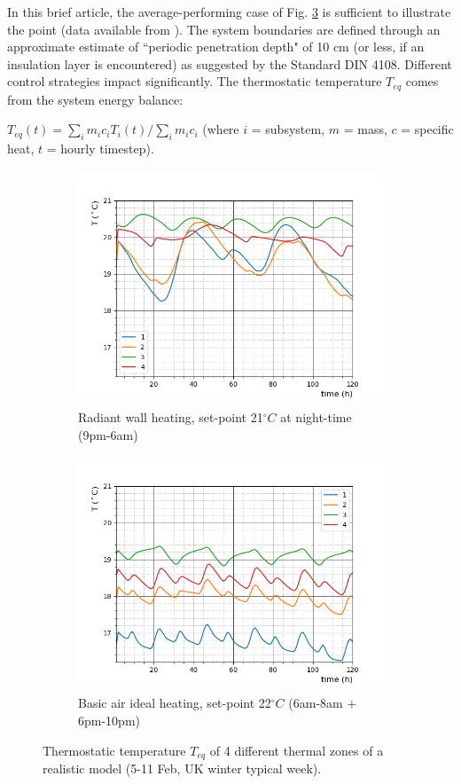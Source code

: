 \documentclass[10pt]{extarticle} %
\begin{document}
In this brief article, the average-performing case of Fig. \ref{fig:casestudy2} is sufficient to illustrate the point (data available from \cite{Bonetti2020}). The system boundaries are defined through an approximate estimate of ``periodic penetration depth" of 10 cm (or less, if an insulation layer is encountered) as suggested by the Standard DIN 4108. Different control strategies impact significantly. The thermostatic temperature $T_{eq}$ comes from the system energy balance: 

$T_{eq}(t)={\sum_i m_i c_i T_i(t)} / {\sum_i m_i c_i}$  \quad  (where $i$ = subsystem, $m$ = mass, $c$ = specific heat, $t$ = hourly timestep).

\vskip-0.35cm


\begin{figure}[h]
 
\begin{subfigure}{0.5\textwidth}
\includegraphics[width=0.99\linewidth, height=7cm]{images/1.png}
\vskip-0.1cm 
\caption{Radiant wall heating, set-point 21$^\circ C$ at night-time (9pm-6am)}
\label{subfig:radiant}
\end{subfigure}
\begin{subfigure}{0.5\textwidth}
\includegraphics[width=0.99\linewidth, height=7cm]{images/2.png}
\vskip-0.1cm 
\caption{Basic air ideal heating, set-point 22$^\circ C$ (6am-8am + 6pm-10pm)}
\label{subfig:basic}
\end{subfigure}
 \vskip-0.2cm
\caption{Thermostatic temperature $T_{eq}$ of 4 different thermal zones of a realistic model (5-11 Feb, UK winter typical week).}
\label{fig:casestudy2}
\end{figure}
\end{document}
